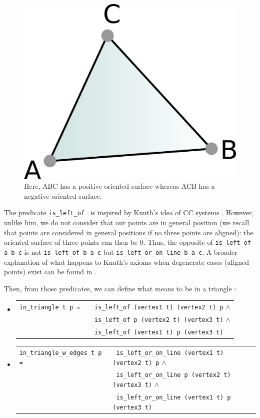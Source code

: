 \documentclass[a4paper,10pt]{article}
\def\ttt#1#2{{\tt{\color{black}#1} #2}}
\begin{document}
\begin{figure}
  \centering
  \includegraphics{Surface}
  \caption{\label{surface} Here, ABC has a positive oriented surface whereas ACB has a negative oriented surface.}
\end{figure}


  The predicate \ttt{is\_left\_of}{} is inspired by Knuth's idea of CC systems \cite{Knuth92}.
  However, unlike him, we do not consider that our points are in general position (we recall that points are considered in general positions if no three points are aligned): the oriented surface of three points can then be 0. Thus, the opposite of \ttt{is\_left\_of}{a b c} is not \ttt{is\_left\_of}{b a c} but \ttt{is\_left\_or\_on\_line}{b a c}. A broader explanation of what happens to Knuth's axioms when degenerate cases (aligned points) exist can be found in \cite{Hull}. \label{knuthpic}

  Then, from those predicates, we can define what means to be in a triangle :
  \begin{itemize}
    \item \begin{tabular}{ll}
       \ttt {in\_triangle}{t p = }& \ttt{}{is\_left\_of (vertex1 t) (vertex2 t) p} $\wedge$\\
        &\ttt{}{is\_left\_of p (vertex2 t) (vertex3 t)} $\wedge$\\
  & \ttt{}{is\_left\_of (vertex1 t) p (vertex3 t)}
      \end{tabular}
\item \begin{tabular}{ll}
       \ttt{in\_triangle\_w\_edges t p}{= }& \ttt{}{is\_left\_or\_on\_line (vertex1 t) (vertex2 t) p} $\wedge$\\
        & \ttt{}{is\_left\_or\_on\_line p  (vertex2 t) (vertex3 t)} $\wedge$\\
  & \ttt{}{is\_left\_or\_on\_line (vertex1 t) p (vertex3 t)}
      \end{tabular}
      \end{itemize}
\end{document}
